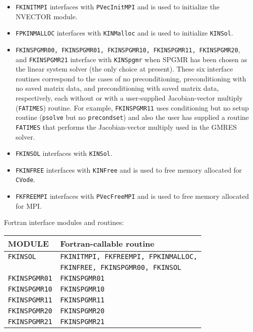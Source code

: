 \begin{itemize}
\item  {\tt FKINITMPI} interfaces with {\tt PVecInitMPI} and is used to
initialize the NVECTOR module.

\item  {\tt FPKINMALLOC} interfaces with {\tt KINMalloc} and is used to
initialize {\tt KINSol}.

\item {\tt FKINSPGMR00, FKINSPGMR01, FKINSPGMR10, FKINSPGMR11, FKINSPGMR20}, 
and \newline
{\tt FKINSPGMR21} interface with {\tt KINSpgmr} 
when SPGMR has been chosen as the linear system solver (the only choice at 
present). These six interface routines correspond to the cases of no 
preconditioning, preconditioning with no saved matrix data, and preconditioning
with saved matrix data, respectively, each  without or with a user-supplied 
Jacobian-vector multiply ({\tt FATIMES}) routine. For example, {\tt FKINSPGMR11}
uses conditioning but no setup routine ({\tt psolve} but no {\tt precondset}) 
and also the user has supplied a routine {\tt FATIMES} that performs the 
Jacobian-vector multiply 	used in the GMRES solver.

\item  {\tt FKINSOL} interfaces with {\tt KINSol}.

\item  {\tt FKINFREE} interfaces with {\tt KINFree} and is used to free
memory allocated for {\tt CVode}.

\item  {\tt FKFREEMPI} interfaces with {\tt PVecFreeMPI} and is used to free
memory allocated for MPI.
\end{itemize}


 { Fortran interface modules and routines:} \label{fortran-interface}
\begin{table} [htb]
\begin{center}
\begin{tabular}{|l|l|} \hline
MODULE & Fortran-callable routine \\ \hline \hline
	
{\tt FKINSOL} & {\tt FKINITMPI, FKFREEMPI, FPKINMALLOC,} \\ 
           &{\tt FKINFREE, FKINSPGMR00, FKINSOL} \\ \hline
{\tt FKINSPGMR01}  &  {\tt FKINSPGMR01} \\ \hline
{\tt FKINSPGMR10}  &  {\tt FKINSPGMR10} \\ \hline
{\tt FKINSPGMR11}  &  {\tt FKINSPGMR11} \\ \hline
{\tt FKINSPGMR20}  &  {\tt FKINSPGMR20} \\ \hline
{\tt FKINSPGMR21}  &  {\tt FKINSPGMR21} \\ \hline
\end{tabular}
\end{center}
\end{table}


